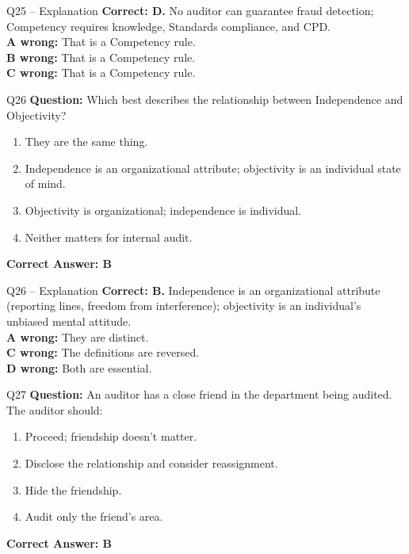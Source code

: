 \documentclass[aspectratio=169,10pt]{beamer}
\begin{document}
	\begin{frame}[t]{Q25 -- Explanation}
		\small
		\textbf{Correct: D.} No auditor can guarantee fraud detection; Competency requires knowledge, Standards compliance, and CPD. \\[4pt]
		\textbf{A wrong:} That is a Competency rule. \\[2pt]
		\textbf{B wrong:} That is a Competency rule. \\[2pt]
		\textbf{C wrong:} That is a Competency rule.
	\end{frame}
	
	\begin{frame}[t]{Q26}
		\small
		\textbf{Question:} Which best describes the relationship between Independence and Objectivity?
		\begin{enumerate}[label=\Alph*.,itemsep=1pt,topsep=2pt]
			\item They are the same thing.
			\item Independence is an organizational attribute; objectivity is an individual state of mind.
			\item Objectivity is organizational; independence is individual.
			\item Neither matters for internal audit.
		\end{enumerate}
		\vspace{4pt}
		\textbf{Correct Answer: B}
	\end{frame}
	
	\begin{frame}[t]{Q26 -- Explanation}
		\small
		\textbf{Correct: B.} Independence is an organizational attribute (reporting lines, freedom from interference); objectivity is an individual's unbiased mental attitude. \\[4pt]
		\textbf{A wrong:} They are distinct. \\[2pt]
		\textbf{C wrong:} The definitions are reversed. \\[2pt]
		\textbf{D wrong:} Both are essential.
	\end{frame}
	
	\begin{frame}[t]{Q27}
		\small
		\textbf{Question:} An auditor has a close friend in the department being audited. The auditor should:
		\begin{enumerate}[label=\Alph*.,itemsep=1pt,topsep=2pt]
			\item Proceed; friendship doesn't matter.
			\item Disclose the relationship and consider reassignment.
			\item Hide the friendship.
			\item Audit only the friend's area.
		\end{enumerate}
		\vspace{4pt}
		\textbf{Correct Answer: B}
	\end{frame}
	
\end{document}

